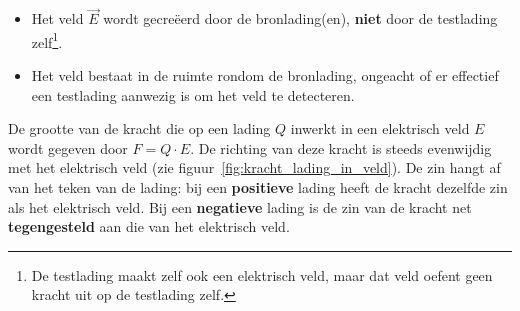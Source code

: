 \documentclass{ximera}
\begin{document}
\begin{proposition}[foldable=true,title={Eigenschappen van het elektrisch veld}]\nl
    \begin{itemize}
        \item Het veld $\vec{E}$ wordt gecreëerd door de bronlading(en), \textbf{niet} door de testlading zelf\footnote{De testlading maakt zelf ook een elektrisch veld, maar dat veld oefent geen kracht uit op de testlading zelf.}.
        \item Het veld bestaat in de ruimte rondom de bronlading, ongeacht of er effectief een testlading aanwezig is om het veld te detecteren.
    \end{itemize}
\end{proposition}


\begin{proposition}[foldable=true,title={Elektrische kracht op een lading in een elektrisch veld}]\nl
    De grootte van de kracht die op een lading $Q$ inwerkt in een elektrisch veld $E$ wordt gegeven door $F=Q\cdot E$. De richting van deze kracht is steeds evenwijdig met het elektrisch veld (zie figuur~\ref{fig:kracht_lading_in_veld}). De zin hangt af van het teken van de lading: bij een \textbf{positieve} lading heeft de kracht dezelfde zin als het elektrisch veld. Bij een \textbf{negatieve} lading is de zin van de kracht net \textbf{tegengesteld} aan die van het elektrisch veld.
\begin{center}
    \centering
\end{center}
\end{proposition}
\end{document}
